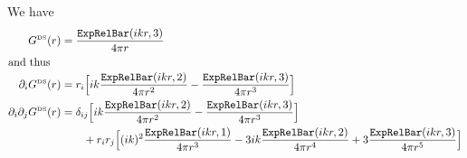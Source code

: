 \documentclass[letterpaper]{article}
\begin{document}
We have
\begin{align*}
 G^{\hbox{\tiny{DS}}}(r) &= \frac{\texttt{ExpRelBar}(ikr,3)}{4\pi r}
\\
\intertext{and thus}
\partial_i 
 G^{\hbox{\tiny{DS}}}(r) &= 
       r_i  \Big[ ik\frac{\texttt{ExpRelBar}(ikr,2)}{4\pi r^2}
                   -\frac{\texttt{ExpRelBar}(ikr,3)}{4\pi r^3}
            \Big]
\\
\partial_i \partial_j
 G^{\hbox{\tiny{DS}}}(r) &= 
  \delta_{ij} \Big[ ik \frac{\texttt{ExpRelBar}(ikr,2)}{4\pi r^2}
                   -\frac{\texttt{ExpRelBar}(ikr,3)}{4\pi r^3}
              \Big]
\\
&\qquad 
 +r_i r_j   \Big[ (ik)^2 \frac{\texttt{ExpRelBar}(ikr,1)}{4\pi r^3}
                  -3ik\frac{\texttt{ExpRelBar}(ikr,2)}{4\pi r^4}
                  +3\frac{\texttt{ExpRelBar}(ikr,3)}{4\pi r^5}
            \Big]
\end{align*}
\end{document}
